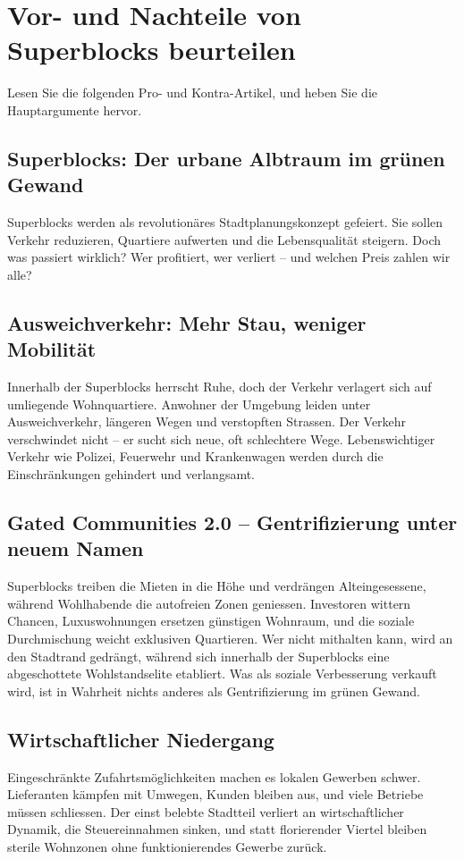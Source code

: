 \section{Vor- und Nachteile von Superblocks beurteilen}
\label{subsec:beurteilen}
Lesen Sie die folgenden Pro- und Kontra-Artikel, und heben Sie die Hauptargumente hervor.
\newpage
\begin{tcolorbox}[title=Kontra-Argumente,
			parbox=false,
			colback=Crimson!10,
			colframe=Crimson,
			colbacktitle=Crimson]
\section*{Superblocks: Der urbane Albtraum im grünen Gewand}
Superblocks werden als revolutionäres Stadtplanungskonzept gefeiert. Sie sollen Verkehr reduzieren, Quartiere aufwerten und die Lebensqualität steigern. Doch was passiert wirklich? Wer profitiert, wer verliert – und welchen Preis zahlen wir alle?

\subsection*{Ausweichverkehr: Mehr Stau, weniger Mobilität}

Innerhalb der Superblocks herrscht Ruhe, doch der Verkehr verlagert sich auf umliegende Wohnquartiere. Anwohner der Umgebung leiden unter Ausweichverkehr, längeren Wegen und verstopften Strassen. Der Verkehr verschwindet nicht – er sucht sich neue, oft schlechtere Wege. Lebenswichtiger Verkehr wie Polizei, Feuerwehr und Krankenwagen werden durch die Einschränkungen gehindert und verlangsamt.

\subsection*{Gated Communities 2.0 – Gentrifizierung unter neuem Namen}
Superblocks treiben die Mieten in die Höhe und verdrängen Alteingesessene, während Wohlhabende die autofreien Zonen geniessen. Investoren wittern Chancen, Luxuswohnungen ersetzen günstigen Wohnraum, und die soziale Durchmischung weicht exklusiven Quartieren. Wer nicht mithalten kann, wird an den Stadtrand gedrängt, während sich innerhalb der Superblocks eine abgeschottete Wohlstandselite etabliert. Was als soziale Verbesserung verkauft wird, ist in Wahrheit nichts anderes als Gentrifizierung im grünen Gewand.

\subsection*{Wirtschaftlicher Niedergang}
Eingeschränkte Zufahrtsmöglichkeiten machen es lokalen Gewerben schwer. Lieferanten kämpfen mit Umwegen, Kunden bleiben aus, und viele Betriebe müssen schliessen. Der einst belebte Stadtteil verliert an wirtschaftlicher Dynamik, die Steuereinnahmen sinken, und statt florierender Viertel bleiben sterile Wohnzonen ohne funktionierendes Gewerbe zurück.


\end{tcolorbox}
